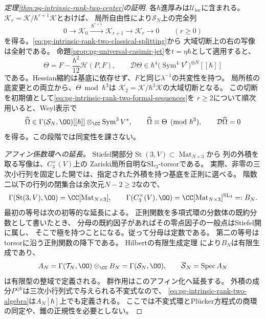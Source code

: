 \begin{proof}[定理\ref{thm:pg-intrinsic-rank-two-center}の証明]
各$\hbar$進厚みは$\mathcal U_{\mathrm{loc}}$に含まれる。
$\mathcal K_r=\mathcal K/\hbar^{r+1}\mathcal K$とおけば、
局所自由性により$\mathcal S_N$上の完全列
\begin{equation}
 0\longrightarrow\mathcal K_0
 \xrightarrow{\ \hbar^{r+1}\ }\mathcal K_{r+1}
 \longrightarrow\mathcal K_r\longrightarrow0
 \qquad(r\ge0)
 \label{eq:pg-intrinsic-rank-two-formal-sequences}
\end{equation}
を得る。\eqref{eq:pg-intrinsic-rank-two-classical-splitting}から
大域切断上の右の写像は全射である。
命題\ref{prop:pg-universal-casimir-jet}を$t=\eta\hbar$として適用すると、
\begin{equation}
 \Theta=F-\frac{\hbar^2}{12}\mathscr H(P,F),\qquad
 \mathcal D\Theta\in\hbar^4
       \bigl(\operatorname{Sym}^4V^*\bigr)^{\oplus N}[[\hbar]]
 \label{eq:pg-intrinsic-initial-second-jet}
\end{equation}
である。Hessian縮約は基底に依存せず、$F$と同じ$\lambda^{-1}$の共変性を持つ。
局所核の底変更との両立から、$\Theta\bmod\hbar^3$は
$\mathcal K_2=\mathcal K/\hbar^3\mathcal K$の大域切断となる。
この切断を初期値として\eqref{eq:pg-intrinsic-rank-two-formal-sequences}を
$r\ge2$について順次用いると、Weyl表示で
\begin{equation}
 \widehat\Omega\in
 \Gamma(\mathcal S_N,\OO)[[\hbar]]
       \otimes_\CC\operatorname{Sym}^3V^*,
 \qquad \widehat\Omega\equiv\Theta\pmod{\hbar^3},
 \qquad \mathcal D\widehat\Omega=0
 \label{eq:pg-intrinsic-rank-two-formal-center}
\end{equation}
を得る。この段階では同変性を課さない。

\emph{アフィン係数環への延長。}
Stiefel開部分$\operatorname{St}(3,V)\subset\operatorname{Mat}_{N\times3}$から
列の外積を取る写像は、$C_3^\times(V)$上の
Zariski局所自明な$\mathrm{SL}_3$-torsorである。
実際、非零の三次小行列を固定した開では、指定された外積を持つ基底を正則に選べる。
階数二以下の行列の閉集合は余次元$N-2\ge2$なので、
\begin{equation}
 \Gamma(\operatorname{St}(3,V),\OO)
      =\CC[\operatorname{Mat}_{N\times3}],\qquad
 \Gamma(C_3^\times(V),\OO)
      =\CC[\operatorname{Mat}_{N\times3}]^{\mathrm{SL}_3}=:B_N.
 \label{eq:pg-intrinsic-rank-two-stiefel-functions}
\end{equation}
最初の等号は次の初等的な延長による。
正則関数を多項式環の分数体の既約分数として書いたとき、
分母の既約因子があればその零点因子の一般点はStiefel開に属し、
そこで極を持つことになる。従って分母は定数である。
第二の等号はtorsorに沿う正則関数の降下である。
Hilbertの有限生成定理
\cite[Theorem~2.1, pp.~368--369]{PDerksenInvariants}により$B_N$は有限生成であり、
\begin{equation}
 A_N=\Gamma(\mathcal T_N,\OO)\otimes_\CC B_N
     =\Gamma(\mathcal S_N,\OO),\qquad
 \overline{\mathcal S}_N=\operatorname{Spec}A_N
 \label{eq:pg-intrinsic-rank-two-affine-base}
\end{equation}
は有限型の整域で定義される。
群作用はこのアフィン化へ延長する。
外積の成分$P^{ijk}$は三次小行列式で与えられる不変式なので、
\eqref{eq:pg-intrinsic-rank-two-algebra}は$A_N[\hbar]$上でも定義される。
ここでは不変式環とPl\"ucker方程式の商環の同定や、錐の正規性を必要としない。


\end{proof}
